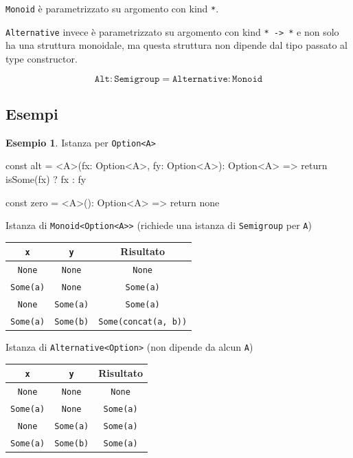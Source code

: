 \documentclass[12pt]{article}
\theoremstyle{definition}
\newtheorem{example}{Esempio}[section]
\newenvironment{code}
  {\vspace{0.5cm} \VerbatimEnvironment\begin{typescriptcode}}
  {\end{typescriptcode} \vspace{0.2cm}}
\begin{document}
\texttt{Monoid} è parametrizzato su argomento con kind \texttt{*}.

\texttt{Alternative} invece è parametrizzato su argomento con kind \texttt{* -> *} e non solo ha una struttura monoidale,
ma questa struttura non dipende dal tipo passato al type constructor.

$$
\texttt{Alt} : \texttt{Semigroup} = \texttt{Alternative} : \texttt{Monoid}
$$

\subsection{Esempi}

\begin{example}
Istanza per \texttt{Option<A>}

\begin{code}
const alt = <A>(fx: Option<A>, fy: Option<A>): Option<A> => {
  return isSome(fx) ? fx : fy
}

const zero = <A>(): Option<A> => {
  return none
}
\end{code}
\end{example}

Istanza di \texttt{Monoid<Option<A>>} (richiede una istanza di \texttt{Semigroup} per \texttt{A})

\begin{center}
\bgroup
\def\arraystretch{1.5}
\begin{tabular}{ |c|c|c| }
\hline
\texttt{x} & \texttt{y} & Risultato \\
\hline
\texttt{None} & \texttt{None} & \texttt{None} \\
\hline
\texttt{Some(a)} & \texttt{None} & \texttt{Some(a)} \\
\hline
\texttt{None} & \texttt{Some(a)} & \texttt{Some(a)} \\
\hline
\texttt{Some(a)} & \texttt{Some(b)} & \texttt{Some(concat(a, b))} \\
\hline
\end{tabular}
\egroup
\end{center}

Istanza di \texttt{Alternative<Option>} (non dipende da alcun \texttt{A})

\begin{center}
\bgroup
\def\arraystretch{1.5}
\begin{tabular}{ |c|c|c| }
\hline
\texttt{x} & \texttt{y} & Risultato \\
\hline
\texttt{None} & \texttt{None} & \texttt{None} \\
\hline
\texttt{Some(a)} & \texttt{None} & \texttt{Some(a)} \\
\hline
\texttt{None} & \texttt{Some(a)} & \texttt{Some(a)} \\
\hline
\texttt{Some(a)} & \texttt{Some(b)} & \texttt{Some(a)} \\
\hline
\end{tabular}
\egroup
\end{center}
\end{document}
